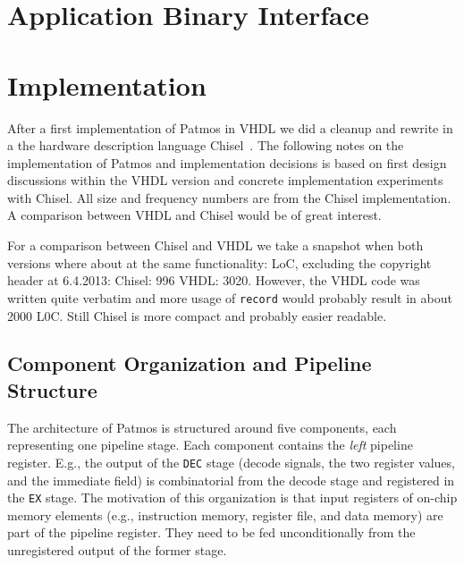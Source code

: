 \documentclass[a4paper,fontsize=10pt,twoside,DIV15,BCOR12mm,headinclude=true,footinclude=false,pagesize,bibtotoc]{scrbook}
\newcommand{\code}[1]{{\texttt{#1}}}
\newcommand{\comment}[3]{

\textsf{\textbf{#1}} {\color{#3}#2}}
\newcommand{\martin}[1]{\comment{Martin}{#1}{Blue}}
\renewcommand{\martin}[1]{}
\begin{document}
\chapter{Application Binary Interface}
\label{sec:abi}




\chapter{Implementation}

\martin{This sections shall describe implementation details,
decisions, and options.}

After a first implementation of Patmos in VHDL we did a cleanup and
rewrite in a the hardware description language Chisel~\cite{chisel:dac2012}.
The following notes on the implementation of Patmos and implementation
decisions is based on first design discussions within the VHDL version
and concrete implementation experiments with Chisel. All size and frequency
numbers are from the Chisel implementation. A comparison between VHDL
and Chisel would be of great interest.

For a comparison between Chisel and VHDL we take a snapshot when both
versions where about at the same functionality: LoC, excluding the copyright
header at 6.4.2013: Chisel: 996 VHDL: 3020. However, the VHDL code was
written quite verbatim and more usage of \code{record} would probably result
in about 2000 L0C. Still Chisel is more compact and probably easier readable.


\section{Component Organization and Pipeline Structure}

The architecture of Patmos is structured around five components, each
representing one pipeline stage. Each component contains the \emph{left}
pipeline register. E.g., the output of the \code{DEC} stage (decode signals,
the two register values, and the immediate field) is combinatorial from
the decode stage and registered in the \code{EX} stage. The motivation of
this organization is that input registers of on-chip memory elements (e.g., instruction
memory, register file, and data memory) are part of the pipeline register.
They need to be fed unconditionally from the unregistered output of
the former stage.
\end{document}
